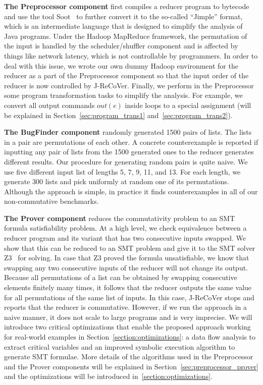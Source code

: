 \documentclass{llncs}
\begin{document}
\textbf{The Preprocessor component} first compiles a reducer program to bytecode and use the tool Soot~\cite{soot} to further convert it to the so-called ``Jimple'' format, which is an intermediate language that is designed to simplify the analysis of Java programs. Under the Hadoop MapReduce framework, the permutation of the input is handled by the scheduler/shuffler component and is affected by things like network latency, which is not controllable by programmers. In order to deal with this issue, we wrote our own dummy Hadoop environment for the reducer as a part of the Preprocessor component so that the input order of the reducer is now controlled by J-ReCoVer. Finally, we perform in the Preprocessor some program transformation tasks to simplify the analysis. For example, we convert all output commands $out(e)$ inside loops to a special assignment (will be explained in Section~\ref{sec:program_trans1} and~\ref{sec:program_trans2}).

\textbf{The BugFinder component} randomly generated 1500 pairs of lists. The lists in a pair are permutations of each other. A concrete counterexample is reported if inputting any pair of lists from the 1500 generated ones to the reducer generates different results.
Our procedure for generating random pairs is quite naive. We use five different input list of lengths 5, 7, 9, 11, and 13. For each length, we generate 300 lists and pick uniformly at random one of its permutations. Although the approach is simple, in practice it finds counterexamples in all of our non-commutative benchmarks.

\textbf{The Prover component} reduces the commutativity problem to an SMT formula satisfiability problem. At a high level, we check equivalence between a reducer program and its variant that has two consecutive inputs swapped. We show that this can be reduced to an SMT problem and give it to the SMT solver Z3~\cite{z3} for solving. In case that Z3 proved the formula unsatisfiable, we know that swapping any two consecutive inputs of the reducer will not change its output. Because all permutations of a list can be obtained by swapping consecutive elements finitely many times, it follows that the reducer outputs the same value for all permutations of the same list of inputs.
In this case,  J-ReCoVer stops and reports that the reducer is commutative.
However, if we run the approach in a naive manner, it does not scale to large programs and is very imprecise.  We will introduce two critical optimizations that enable the proposed approach working for real-world examples in Section~\ref{section:optimizations}: a data flow analysis to extract critical variables and an improved symbolic execution algorithm to generate SMT formulae. More details of the algorithms used in the Preprocessor and the Prover components will be explained in Section~\ref{sec:preprocessor_prover} and the optimizations will be introduced in~\ref{section:optimizations}.
\end{document}
